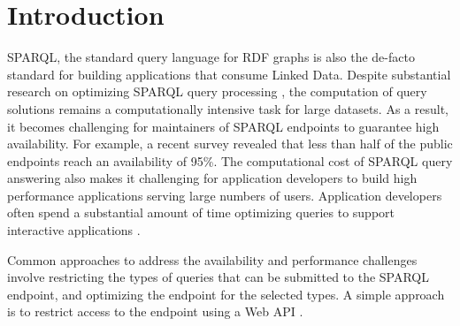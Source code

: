 \section{Introduction}
SPARQL, the standard query language for RDF graphs is also the de-facto standard for building applications that consume Linked Data. 
Despite substantial research on optimizing SPARQL query processing \cite{Pham2013}, the computation of query solutions remains a computationally intensive task for large datasets.
As a result, it becomes challenging for maintainers of SPARQL endpoints to guarantee high availability.
For example, a recent survey \cite{buil2013sparql} revealed that less than half of the public endpoints reach an availability of 95\%.
The computational cost of SPARQL query answering also makes it challenging for application developers to build high performance applications serving large numbers of users.
Application developers often spend a substantial amount of time optimizing queries to support interactive applications \cite{Loizou_Angles_Groth_2014}.

Common approaches to address the availability and performance challenges involve restricting the types of queries that can be submitted to the SPARQL endpoint, and optimizing the endpoint for the selected types.
A simple approach is to restrict access to the endpoint using a Web API \cite{Groth_Loizou_Gray_Goble_Harland_Pettifer_2014}.